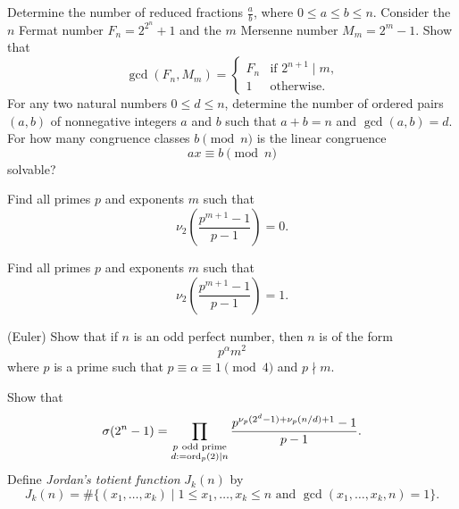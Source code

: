 \begin{challenge}
  \exercise Determine the number of reduced fractions $\tfrac{a}{b}$, where $0\leq a\leq b\leq n$.
  \exercise Consider the $n$\supth{} Fermat number $F_n=2^{2^n}+1$ and the $m$\supth{} Mersenne number $M_m=2^m-1$. Show that
  \begin{equation*}
    \gcd(F_n,M_m)=
    \begin{cases}
      F_n & \text{if $2^{n+1}\mid m$,}\\
      1 & \text{otherwise.}
    \end{cases}
  \end{equation*}
  \exercise For any two natural numbers $0\leq d\leq n$, determine the number of ordered pairs $(a,b)$ of nonnegative integers $a$ and $b$ such that $a+b=n$ and $\gcd(a,b)=d$.
  \exercise For how many congruence classes $b \pmod{n}$ is the linear congruence
  \begin{equation*}
    ax\equiv b\pmod{n}
  \end{equation*}
  solvable?
  \exercise
  \begin{subexenum}
  \item Find all primes $p$ and exponents $m$ such that
    \begin{equation*}
      \nu_2\left(\frac{p^{m+1}-1}{p-1}\right)=0.
    \end{equation*}
  \item Find all primes $p$ and exponents $m$ such that
    \begin{equation*}
      \nu_2\left(\frac{p^{m+1}-1}{p-1}\right)=1.
    \end{equation*}
  \item (Euler) Show that if $n$ is an odd perfect number, then $n$ is of the form
    \begin{equation*}
      p^{\alpha}m^2
    \end{equation*}
    where $p$ is a prime such that $p\equiv \alpha \equiv 1\pmod{4}$ and $p\nmid m$.
  \end{subexenum}
  \exercise Show that
  \begin{equation*}
    \sigma(2^n-1) = \prod_{\substack{p~\text{odd prime}\\d:=\operatorname{ord}_p(2)\mid n}}\frac{p^{\nu_p(2^d-1)+\nu_p(n/d)+1}-1}{p-1}.
  \end{equation*}
  \exercise Define \emph{Jordan's totient function} $J_k(n)$ by
  \begin{equation*}
    J_k(n) = \#\{(x_1,\ldots,x_k)\mid 1\leq x_1,\ldots,x_k\leq n\text{ and }\gcd(x_1,\ldots,x_k,n)=1\}.

\end{equation*}
\end{challenge}
